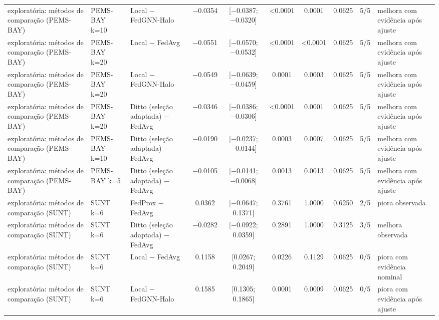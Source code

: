 \begin{tabular}{lllccccccl}
exploratória: métodos de comparação (PEMS-BAY) & PEMS-BAY k=10 & Local − FedGNN-Halo & \num{-0.0354} & [\num{-0.0387}; \num{-0.0320}] & \num{<0.0001} & \num{0.0001} & \num{0.0625} & 5/5 & melhora com evidência após ajuste \\
exploratória: métodos de comparação (PEMS-BAY) & PEMS-BAY k=20 & Local − FedAvg & \num{-0.0551} & [\num{-0.0570}; \num{-0.0532}] & \num{<0.0001} & \num{<0.0001} & \num{0.0625} & 5/5 & melhora com evidência após ajuste \\
exploratória: métodos de comparação (PEMS-BAY) & PEMS-BAY k=20 & Local − FedGNN-Halo & \num{-0.0549} & [\num{-0.0639}; \num{-0.0459}] & \num{0.0001} & \num{0.0003} & \num{0.0625} & 5/5 & melhora com evidência após ajuste \\
exploratória: métodos de comparação (PEMS-BAY) & PEMS-BAY k=20 & Ditto (seleção adaptada) − FedAvg & \num{-0.0346} & [\num{-0.0386}; \num{-0.0306}] & \num{<0.0001} & \num{0.0001} & \num{0.0625} & 5/5 & melhora com evidência após ajuste \\
exploratória: métodos de comparação (PEMS-BAY) & PEMS-BAY k=10 & Ditto (seleção adaptada) − FedAvg & \num{-0.0190} & [\num{-0.0237}; \num{-0.0144}] & \num{0.0003} & \num{0.0007} & \num{0.0625} & 5/5 & melhora com evidência após ajuste \\
exploratória: métodos de comparação (PEMS-BAY) & PEMS-BAY k=5 & Ditto (seleção adaptada) − FedAvg & \num{-0.0105} & [\num{-0.0141}; \num{-0.0068}] & \num{0.0013} & \num{0.0013} & \num{0.0625} & 5/5 & melhora com evidência após ajuste \\
exploratória: métodos de comparação (SUNT) & SUNT k=6 & FedProx − FedAvg & \num{+0.0362} & [\num{-0.0647}; \num{+0.1371}] & \num{0.3761} & \num{1.0000} & \num{0.6250} & 2/5 & piora observada \\
exploratória: métodos de comparação (SUNT) & SUNT k=6 & Ditto (seleção adaptada) − FedAvg & \num{-0.0282} & [\num{-0.0922}; \num{+0.0359}] & \num{0.2891} & \num{1.0000} & \num{0.3125} & 3/5 & melhora observada \\
exploratória: métodos de comparação (SUNT) & SUNT k=6 & Local − FedAvg & \num{+0.1158} & [\num{+0.0267}; \num{+0.2049}] & \num{0.0226} & \num{0.1129} & \num{0.0625} & 0/5 & piora com evidência nominal \\
exploratória: métodos de comparação (SUNT) & SUNT k=6 & Local − FedGNN-Halo & \num{+0.1585} & [\num{+0.1305}; \num{+0.1865}] & \num{0.0001} & \num{0.0009} & \num{0.0625} & 0/5 & piora com evidência após ajuste \\

\end{tabular}
